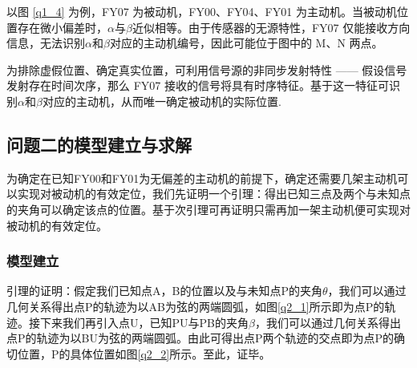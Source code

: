 \documentclass[withoutpreface,bwprint]{cumcmthesis} %
\begin{document}
以图 \ref{q1_4} 为例，FY07 为被动机，FY00、FY04、FY01 为主动机。当被动机位置存在微小偏差时，$\alpha$与$\beta$近似相等。由于传感器的无源特性，FY07 仅能接收方向信息，无法识别$\alpha$和$\beta$对应的主动机编号，因此可能位于图中的 M、N 两点。

为排除虚假位置、确定真实位置，可利用信号源的非同步发射特性 —— 假设信号发射存在时间次序，那么 FY07 接收的信号将具有时序特征。基于这一特征可识别$\alpha$和$\beta$对应的主动机，从而唯一确定被动机的实际位置.


\subsection{问题二的模型建立与求解}
为确定在已知FY00和FY01为无偏差的主动机的前提下，确定还需要几架主动机可以实现对被动机的有效定位，我们先证明一个引理：得出已知三点及两个与未知点的夹角可以确定该点的位置。基于次引理可再证明只需再加一架主动机便可实现对被动机的有效定位。
\subsubsection{模型建立}
引理的证明：假定我们已知点A，B的位置以及与未知点P的夹角$\theta$，我们可以通过几何关系得出点P的轨迹为以AB为弦的两端圆弧，如图\ref{q2_1}所示即为点P的轨迹。接下来我们再引入点U，已知PU与PB的夹角$\beta$，我们可以通过几何关系得出点P的轨迹为以BU为弦的两端圆弧。由此可得出点P两个轨迹的交点即为点P的确切位置，P的具体位置如图\ref{q2_2}所示。至此，证毕。
\end{document}

